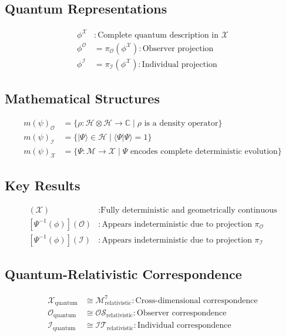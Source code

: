 \documentclass{article}
\begin{document}
\subsection{Quantum Representations}
\begin{align}
\phi^{\mathcal{X}} &: \text{Complete quantum description in } \mathcal{X} \\
\phi^{\mathcal{O}} &= \pi_{\mathcal{O}}(\phi^{\mathcal{X}}) : \text{Observer projection} \\
\phi^{\mathcal{I}} &= \pi_{\mathcal{I}}(\phi^{\mathcal{X}}) : \text{Individual projection}
\end{align}

\subsection{Mathematical Structures}
\begin{align}
m(\psi)_{\mathcal{O}} &= \{\rho: \mathcal{H} \otimes \mathcal{H} \rightarrow \mathbb{C} \mid \rho \text{ is a density operator}\} \\
m(\psi)_{\mathcal{I}} &= \{|\Psi\rangle \in \mathcal{H} \mid \langle\Psi|\Psi\rangle = 1\} \\
m(\psi)_{\mathcal{X}} &= \{\Psi: \mathcal{M} \rightarrow \mathcal{X} \mid \Psi \text{ encodes complete deterministic evolution}\}
\end{align}

\subsection{Key Results}
\begin{align}
[\Psi^{-1}(\phi)](\mathcal{X}) &: \text{Fully deterministic and geometrically continuous} \\
[\Psi^{-1}(\phi)](\mathcal{O}) &: \text{Appears indeterministic due to projection } \pi_{\mathcal{O}} \\
[\Psi^{-1}(\phi)](\mathcal{I}) &: \text{Appears indeterministic due to projection } \pi_{\mathcal{I}}
\end{align}

\subsection{Quantum-Relativistic Correspondence}
\begin{align}
\mathcal{X}_{\text{quantum}} &\cong \mathcal{M}^7_{\text{relativistic}} : \text{Cross-dimensional correspondence} \\
\mathcal{O}_{\text{quantum}} &\cong \mathcal{OS}_{\text{relativistic}} : \text{Observer correspondence} \\
\mathcal{I}_{\text{quantum}} &\cong \mathcal{IT}_{\text{relativistic}} : \text{Individual correspondence}
\end{align}
\end{document}
